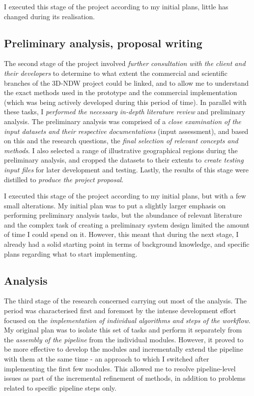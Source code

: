 I executed this stage of the project according to my initial plans, little has changed during its realisation.

\subsection{Preliminary analysis, proposal writing}
\label{sub:preliminaryanalysis}

The second stage of the project involved \textit{further consultation with the client and their developers} to determine to what extent the commercial and scientific branches of the 3D-NDW project could be linked, and to allow me to understand the exact methods used in the prototype and the commercial implementation (which was being actively developed during this period of time). In parallel with these tasks, I \textit{performed the necessary in-depth literature review} and preliminary analysis. The preliminary analysis was comprised  of a \textit{close examination of the input datasets and their respective documentations} (input assessment), and based on this and the research questions, the \textit{final selection of relevant concepts and methods}. I also selected a range of illustrative geographical regions during the preliminary analysis, and cropped the datasets to their extents to \textit{create testing input files} for later development and testing. Lastly, the results of this stage were distilled to \textit{produce the project proposal}.

I executed this stage of the project according to my initial plans, but with a few small alterations. My initial plan was to put a slightly larger emphasis on performing preliminary analysis tasks, but the abundance of relevant literature and the complex task of creating a preliminary system design limited the amount of time I could spend on it. However, this meant that during the next stage, I already had a solid starting point in terms of background knowledge, and specific plans regarding what to start implementing.

\subsection{Analysis}
\label{sub:analysis}

The third stage of the research concerned carrying out most of the analysis. The period was characterised first and foremost by the intense development effort focused on the \textit{implementation of individual algorithms and steps of the workflow}. My original plan was to isolate this set of tasks and perform it separately from the \textit{assembly of the pipeline} from the individual modules. However, it proved to be more effective to develop the modules and incrementally extend the pipeline with them at the same time - an approach to which I switched after implementing the first few modules. This allowed me to resolve pipeline-level issues as part of the incremental refinement of methods, in addition to problems related to specific pipeline steps only.


